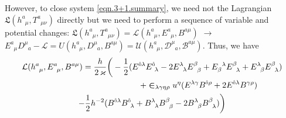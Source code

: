 \documentclass[
10pt, %
a4paper, %
oneside, %
headinclude,footinclude, %
BCOR5mm, %
]{scrartcl}
\newcommand{\sA}{\mathsmaller A}
\newcommand{\tetrsymbol}{h}
\newcommand{\itetrsymbol}{\eta}
\newcommand{\itetr}[2]{\itetrsymbol^{#1}_{\phantom{#1}#2}}
\newcommand{\tetr}[2]{\tetrsymbol^{#1}_{\phantom{#1}#2}}
\newcommand{\detTetr}{\tetrsymbol}
\newcommand{\Tors}[2]{T^{#1}_{\phantom{a}#2}}
\newcommand{\ET}[2]{E^{#1}_{\phantom{#1}#2}}	%
\newcommand{\ETmix}[2]{E^{#1}_{#2}}	%
\newcommand{\Dm}[2]{D_{\phantom{#2}#1}^{#2}}	%
\newcommand{\aD}[2]{\mathcal{D}_{\phantom{#2}#1}^{#2}}	%
\newcommand{\BT}[2]{B^{#1#2}}	%
\newcommand{\BTmix}[2]{B^{#1}_{#2}}	%
\newcommand{\Bm}[2]{B^{#1#2}}	%
\newcommand{\aB}[2]{\mathcal{B}^{#1#2}}	%
\newcommand{\Lagtors}{\mathfrak{L}}%
\newcommand{\LagBE}{\mathcal{L}}%
\newcommand{\Um}{U}%
\newcommand{\aU}{\mathcal{U}}%
\newcommand{\LCsymb}{\bm{\in}}    %
\newcommand{\indalg}[1]{\hat{\mathsmaller{#1}}}
\begin{document}
However, to close system \eqref{eqn.3+1.summary}, we need not the Lagrangian $ 
\Lagtors(\tetr{a}{\mu},\Tors{a}{\mu\nu})  $ directly but we need to perform a sequence of variable 
and potential changes: $ \Lagtors(\tetr{a}{\mu},\Tors{a}{\mu\nu}) = 
\LagBE(\tetr{a}{\mu},\ET{a}{\mu},\BT{a}{\mu}) $ $ \longrightarrow $ $ \ET{a}{\mu} 
\Dm{a}{\mu} - \LagBE = 
\Um(\tetr{a}{\mu},\Dm{a}{\mu},\Bm{a}{\mu}) = 
\aU(\tetr{a}{\mu},\aD{a}{\mu},\aB{a}{\mu}) $. 
Thus, we have
\begin{multline}\label{eqn.Tscal.EB}
	\LagBE(\tetr{a}{\mu},\ET{a}{\mu},\BT{a}{\mu}) = \frac{\detTetr}{2 \, \varkappa}
	\bigg(
	-\frac12 (\ETmix{\indalg{0}\lambda}{}\ETmix{\indalg{0}}{\ \lambda} -  
	2\ETmix{\lambda}{\ \,\lambda}\ETmix{\beta}{\ \,\beta} +
	\ETmix{\ \,\lambda}{\beta} \ETmix{\beta}{\ \,\lambda}  +
	\ETmix{\lambda}{\ \,\beta}\ETmix{\beta}{\ \,\lambda} )
	\\
	\hspace{4cm} + \LCsymb_{\lambda\gamma\eta\rho} u^\eta 
	(\ETmix{\lambda\gamma}{}\BTmix{\indalg{0}\rho}{} + 2 
	\ET{\indalg{0}\lambda}{}\BTmix{\gamma\rho}{})
	\\
	- \frac12 h^{-2} ( \BTmix{\indalg{0}\lambda}{}\BTmix{\indalg{0}}{\ \lambda}
	+ \BTmix{\lambda}{\ \,\lambda}\BTmix{\beta}{\ \,\beta}
	- 2\BTmix{\lambda}{\ \,\beta}\BTmix{\beta}{\ \,\lambda}
	)
	\bigg)
\end{multline}
%
\end{document}
